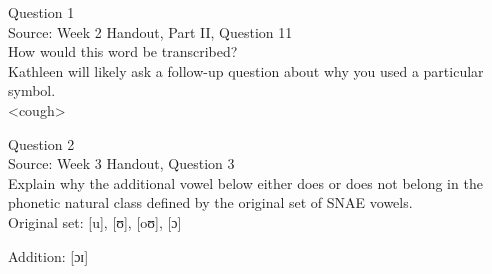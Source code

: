 \documentclass[12pt]{article}
\begin{document}
\begin{center}
\textbf{{\color{violet}{\HUGE 20201001 Thursday\\}}}

\textbf{{\color{violet}{\HUGE ALL EXAMS\\}}}

\end{center}
\newpage

\begin{center}
\textbf{{\color{blue}{\HUGE START OF EXAM\\}}}

\textbf{{\color{blue}{\HUGE Student ID: 80652\\}}}

\textbf{{\color{blue}{\HUGE 4:00\\}}}

\end{center}
\newpage

{\large Question 1}\\

Source: Week 2 Handout, Part II, Question 11\\

How would this word be transcribed?\\ Kathleen will likely ask a follow-up question about why you used a particular symbol.\\

<cough>


\newpage

{\large Question 2}\\

Source: Week 3 Handout, Question 3\\

Explain why the additional vowel below either does or does not belong in the phonetic natural class defined by the original set of SNAE vowels.\\

Original set: {[u]}, {[ʊ]}, {[oʊ]}, {[ɔ]}

Addition: {[ɔɪ]}


\newpage

\begin{center}
\textbf{{\color{red}{\HUGE END OF EXAM}}}\\

\end{center}
\newpage

\begin{center}
\textbf{{\color{blue}{\HUGE START OF EXAM\\}}}

\textbf{{\color{blue}{\HUGE Student ID: 81020\\}}}

\textbf{{\color{blue}{\HUGE 4:10\\}}}

\end{center}
\newpage
\end{document}
